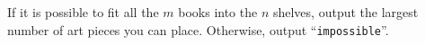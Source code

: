 
If it is possible to fit all the $m$ books into the $n$ shelves, output the largest number of art pieces you can place.
Otherwise, output ``\texttt{impossible}''.
